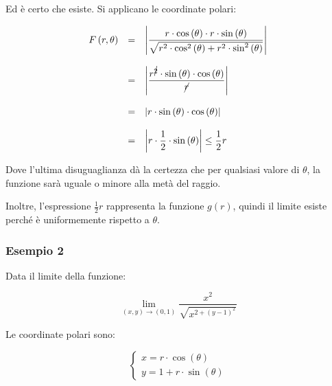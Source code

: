 \documentclass[a4paper]{article}
\begin{document}
	\noindent
	Ed è certo che esiste.\newline
	Si applicano le coordinate polari:
	
	\begin{equation*}
		\begin{array}{lll}
			F\left(r,\theta\right) & = & \left|\dfrac{r \cdot \cos\left(\theta\right) \cdot r \cdot \sin\left(\theta\right)}{\sqrt{r^{2} \cdot \cos^{2}\left(\theta\right) + r^{2} \cdot \sin^{2}\left(\theta\right)}}\right| \\
			&& \\
			& = & \left|\dfrac{r^{\cancel{2}} \cdot \sin\left(\theta\right) \cdot \cos\left(\theta\right)}{\cancel{r}}\right| \\
			&& \\
			& = & \left|r \cdot \sin\left(\theta\right) \cdot \cos\left(\theta\right)\right| \\
			&& \\
			& = & \left|r \cdot \dfrac{1}{2} \cdot \sin\left(\theta\right)\right| \le \dfrac{1}{2}r
		\end{array}
	\end{equation*}

	\noindent
	Dove l'ultima disuguaglianza dà la certezza che per qualsiasi valore di $\theta$, la funzione sarà uguale o minore alla metà del raggio.\newline
	
	\noindent
	Inoltre, l'espressione $\frac{1}{2}r$ rappresenta la funzione $g\left(r\right)$, quindi il limite esiste perché è uniformemente rispetto a $\theta$.
	
	\subsubsection[Esempio 2]{\textcolor{Green4}{Esempio 2}}
	
	Data il limite della funzione:
	
	\begin{equation*}
		\lim_{\left(x,y\right) \rightarrow \left(0,1\right)} \dfrac{x^{2}}{\sqrt{x^{{2} + \left(y-1\right)^{2}}}}
	\end{equation*}

	\noindent
	Le coordinate polari sono:
	
	\begin{equation*}
		\begin{cases}
			x = r \cdot \cos\left(\theta\right) \\
			y = 1 + r \cdot \sin\left(\theta\right)
		\end{cases}
	\end{equation*}
\end{document}
